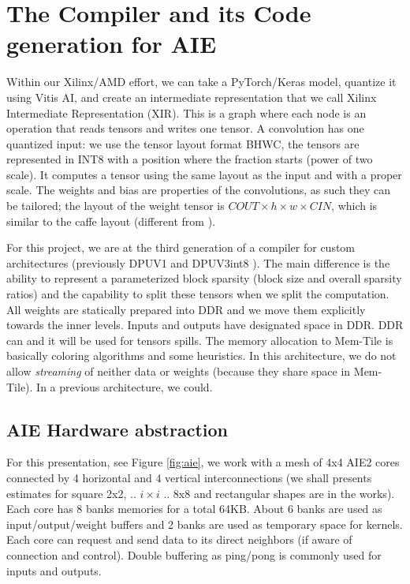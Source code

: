 \documentclass[sigconf]{acmart}
\begin{document}
\section{The Compiler and its Code generation for AIE}
\label{sec:compiler}
Within our Xilinx/AMD effort, we can take a PyTorch/Keras model,
quantize it using Vitis AI, and create an intermediate representation
that we call Xilinx Intermediate Representation (XIR). This is a graph
where each node is an operation that reads tensors and writes one tensor. A
convolution has one quantized input: we use the tensor layout format
BHWC, the tensors are represented in INT8 with a position where the
fraction starts (power of two scale). It computes a tensor using the
same layout as the input and with a proper scale. The weights and bias
are properties of the convolutions, as such they can be tailored; the
layout of the weight tensor is $COUT\times h \times w \times CIN$,
which is similar to the caffe layout \cite{Caffe} (different from
\cite{tensorflow}).

For this project, we are at the third generation of a compiler for
custom architectures (previously DPUV1 and DPUV3int8
\cite{10.1145/3473334,abs-2110-04327}). The main difference is the
ability to represent a parameterized block sparsity (block size and
overall sparsity ratios) and the capability to split these tensors
when we split the computation. All weights are statically prepared
into DDR and we move them explicitly towards the inner levels. Inputs
and outputs have designated space in DDR. DDR can and it will be used
for tensors spills.  The memory allocation to Mem-Tile is basically
coloring algorithms and some heuristics. In this architecture, we do
not allow {\em streaming} of neither data or weights (because they
share space in Mem-Tile). In a previous architecture, we could.

\subsection{AIE Hardware abstraction}


For this presentation, see Figure \ref{fig:aie}, we work with a mesh
of 4x4 AIE2 cores connected by 4 horizontal and 4 vertical
interconnections (we shall presents estimates for square 2x2,
.. $i\times i$ .. 8x8 and rectangular shapes are in the works). Each
core has 8 banks memories for a total 64KB. About 6 banks are used as
input/output/weight buffers and 2 banks are used as temporary space
for kernels. Each core can request and send data to its direct
neighbors (if aware of connection and control). Double buffering as
ping/pong is commonly used for inputs and outputs.
\end{document}
